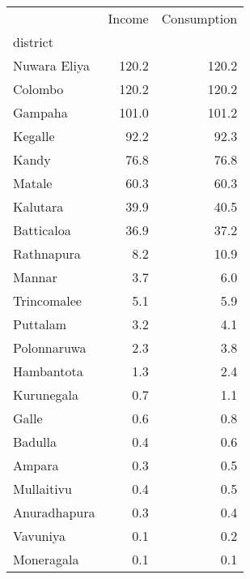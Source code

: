\begin{tabular}{lrr}
\toprule
{} &  Income &  Consumption \\
district     &         &              \\
\midrule
Nuwara Eliya &   120.2 &        120.2 \\
Colombo      &   120.2 &        120.2 \\
Gampaha      &   101.0 &        101.2 \\
Kegalle      &    92.2 &         92.3 \\
Kandy        &    76.8 &         76.8 \\
Matale       &    60.3 &         60.3 \\
Kalutara     &    39.9 &         40.5 \\
Batticaloa   &    36.9 &         37.2 \\
Rathnapura   &     8.2 &         10.9 \\
Mannar       &     3.7 &          6.0 \\
Trincomalee  &     5.1 &          5.9 \\
Puttalam     &     3.2 &          4.1 \\
Polonnaruwa  &     2.3 &          3.8 \\
Hambantota   &     1.3 &          2.4 \\
Kurunegala   &     0.7 &          1.1 \\
Galle        &     0.6 &          0.8 \\
Badulla      &     0.4 &          0.6 \\
Ampara       &     0.3 &          0.5 \\
Mullaitivu   &     0.4 &          0.5 \\
Anuradhapura &     0.3 &          0.4 \\
Vavuniya     &     0.1 &          0.2 \\
Moneragala   &     0.1 &          0.1 \\
\bottomrule
\end{tabular}
